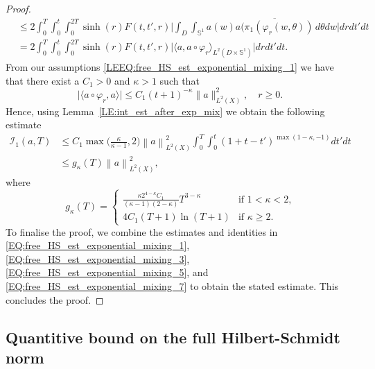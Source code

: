 \documentclass[11pt,twoside,reqno]{amsart}
\renewcommand{\phi}{\varphi}
\newcommand{\1}{\mathrm{\mathbf{1}}}
\newcommand{\norm}[1]{\left\lVert#1\right\rVert}
\numberwithin{equation}{section}
\theoremstyle{plain}
\theoremstyle{definition}
\theoremstyle{remark}
\begin{document}
\begin{proof}
\begin{equation*}
\begin{aligned}
        &\leq 2 \int_0^T\int_0^t \int_{0}^{2T} \sinh(r)F(t,t',r)  \Big| \int_{D}   \int_{\mathbb{S}^1 } a(w) \overline{a(\pi_1(\varphi_r(w,\theta))}  \,d \theta d w   \Big| d r   d t'd t
        \\
        &= 2 \int_0^T\int_0^t \int_{0}^{2T} \sinh(r)F(t,t',r)  \big| \langle a, a\circ \varphi_r\rangle_{L^2(D\times \mathbb{S}^1)}   \big| d r   d t'd t.
    \end{aligned}
\end{equation*}
From our assumptions \eqref{LEEQ:free_HS_est_exponential_mixing_1} we have that there exist a $C_1>0$ and $\kappa>1$ such that 
\begin{equation*}
  \big|\langle a \circ \phi_r, a \rangle \big| \leq C_1 (t+1)^{-\kappa} \lVert a \rVert_{L^2(X)}^2,\quad r \geq 0.  
\end{equation*}
Hence, using Lemma~\ref{LE:int_est_after_exp_mix} we obtain the following estimate
\begin{equation}\label{EQ:free_HS_est_exponential_mixing_7}
    \begin{aligned}
        \mathcal{I}_1(a,T)
        &\leq C_1 \max\big(\tfrac{\kappa}{\kappa-1},2\big)\norm{a}^2_{L^2(X)} \int_0^T\int_0^t (1+t-t')^{\max (1-\kappa,-1)}   d t'd t
        \\
        & \leq  g_\kappa(T) \norm{a}^2_{L^2(X)},
    \end{aligned}
\end{equation}
where
\begin{equation*}
    g_\kappa(T) = \begin{cases}
        \frac{\kappa 2^{4-\kappa} C_1}{(\kappa -1)(2-\kappa)} T^{3-\kappa} & \text{if $1<\kappa<2$,}\\
        4 C_1(T+1)\ln (T+1) & \text{if $\kappa\geq 2$.}
    \end{cases}        
\end{equation*}
To finalise the proof, we combine the estimates and identities in \eqref{EQ:free_HS_est_exponential_mixing_1}, \eqref{EQ:free_HS_est_exponential_mixing_3}, \eqref{EQ:free_HS_est_exponential_mixing_5}, and \eqref{EQ:free_HS_est_exponential_mixing_7} to obtain the stated estimate. This concludes the proof.    
\end{proof}

\subsection{Quantitive bound on the full Hilbert-Schmidt norm}
\end{document}
